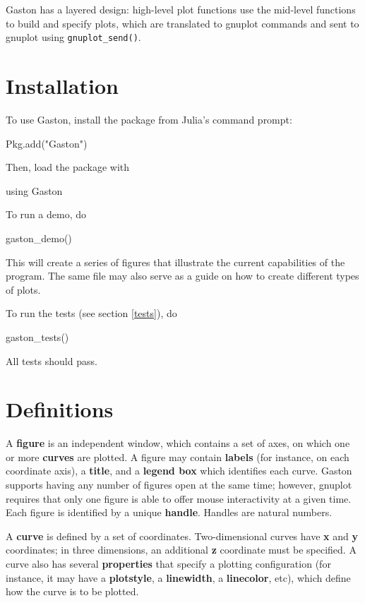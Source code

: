 \documentclass[11pt]{article}
\newcommand{\cmd}[1]{\texttt{#1}}
\begin{document}
Gaston has a layered design: high-level plot functions use the mid-level
functions to build and specify plots, which are translated to gnuplot commands
and sent to gnuplot using \cmd{gnuplot\_send()}.

\section{Installation}

To use Gaston, install the package from Julia's command prompt:

\begin{juliacode}
Pkg.add("Gaston")
\end{juliacode}

Then, load the package with

\begin{juliacode}
using Gaston
\end{juliacode}

To run a demo, do

\begin{juliacode}
gaston_demo()
\end{juliacode}

This will create a series of figures that illustrate the current capabilities
of the program. The same file may also serve as a guide on how to create
different types of plots.

To run the tests (see section \ref{tests}), do

\begin{juliacode}
gaston_tests()
\end{juliacode}

All tests should pass.

\section{Definitions}

A \textbf{figure} is an independent window, which contains a set of axes, on
which one or more \textbf{curves} are plotted. A figure may contain
\textbf{labels} (for instance, on each coordinate axis), a \textbf{title}, and a
\textbf{legend box} which identifies each curve. Gaston supports having any
number of figures open at the same time; however, gnuplot requires that only
one figure is able to offer mouse interactivity at a given time. Each figure is
identified by a unique \textbf{handle}. Handles are natural numbers.

A \textbf{curve} is defined by a set of coordinates. Two-dimensional curves
have \textbf{x} and \textbf{y} coordinates; in three dimensions, an additional
\textbf{z} coordinate must be specified. A curve also has several
\textbf{properties} that specify a plotting configuration (for instance, it may
have a \textbf{plotstyle}, a \textbf{linewidth}, a \textbf{linecolor}, etc),
which define how the curve is to be plotted.
\end{document}
